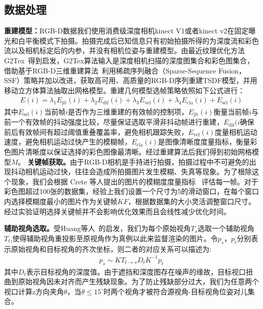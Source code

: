 \subsection{数据处理}
\noindent\textbf{重建模型：}RGB-D数据我们使用消费级深度相机kinect V1或者kinect v2在固定曝光和白平衡模式下拍摄。拍摄完成后已知信息只有初始拍摄所得的为深度流和彩色流以及相机标定后的内参，并没有相机位姿与重建模型。由最近纹理优化方法G2Tex~\cite{fu2018texture}得到启发，G2Tex算法输入是深度相机扫描的深度图集合和彩色图集合，借助基于RGB-D三维重建算法~\cite{LongYang2018SurfaceRV}利用稀疏序列融合（Sparse-Sequence Fusion，SSF）策略并加以改进，获取高可用、高质量的RGB-D序列重建TSDF模型，并用移动立方体算法抽取出网格模型。重建几何模型选帧策略依照如下公式进行：
\begin{align}
E(i)= \lambda_{1} E_{\mathrm{jit}}(i)+\lambda_{2} E_{\mathrm{dif}}(i)+\lambda_{3} E_{\mathrm{vel}}(i)+\lambda_{4}E_{\mathrm{cla}}(i)+E_{\mathrm{sel}}(i)
\end{align}
其中$E_{\mathrm{sel}}(i)$当前帧$i$是否作为三维重建的有效帧的控制项，$E_{\mathrm{jit}}(i)$衡量当前帧$i$与前一个有效帧的抖动强度比较，尽量保证选取平滑非抖动帧进行重建，$E_{\mathrm{dif}}(i$确保前后有效帧间有超过阈值重叠覆盖率，避免相机跟踪失败，$E_{\mathrm{vel}}(i)$度量相机运动速度，避免相机运动过快产生的模糊帧，$E_{\mathrm{cla}}(i)$是图像清晰度度量指标，衡量彩色图片清晰度以保证选择的彩色图像最清晰。经过重建算法后我们得到初始网格模型$M$。
\noindent\textbf{关键帧获取。}由于RGB-D相机是手持进行拍摄，拍摄过程中不可避免的出现抖动相机运动过快，往往会造成所拍摄图片发生模糊、失真等现象。为了根除这个现象，我们会根据 Crete 等人提出的图片的模糊度度量指标 ~\cite{FrederiqueCrete2007TheBE}评估每一帧。对于彩色图超过100张的数据集，经验上我们设置一个尺寸为5的滑动窗口，在每个窗口内选择模糊度最小的图片作为关键帧$KF$，根据数据集的大小灵活调整窗口尺寸。经过实验证明选择关键帧并不会影响优化效果而且会线性减少优化时间。 \par
\noindent\textbf{辅助视角选取。}受Huang等人~\cite{JingweiHuang2020AdversarialTO}的启发，我们为每个原始视角$T_s$选取一个辅助视角$T_t$,使得辅助视角重投影至原视角作为真例以此来监督渲染的图片。令$p_s$，$p_t$分别表示原始视角和目标视角的齐次坐标，则二者的对应关系可以描述为:
\begin{align}
	p_s\sim KT_{t\rightarrow s}D_tK^{-1}p_t
\end{align}
其中$D_t$表示目标视角的深度值。由于遮挡和深度图存在噪声的缘故，目标视口扭曲到原始视角因未对齐而产生残缺现象。为了防止残缺部分过大，我们为任意两个视口计算z方向夹角$\theta$，当$\theta\le15^{\circ}$时两个视角才被符合源视角-目标视角位姿对儿集合。

